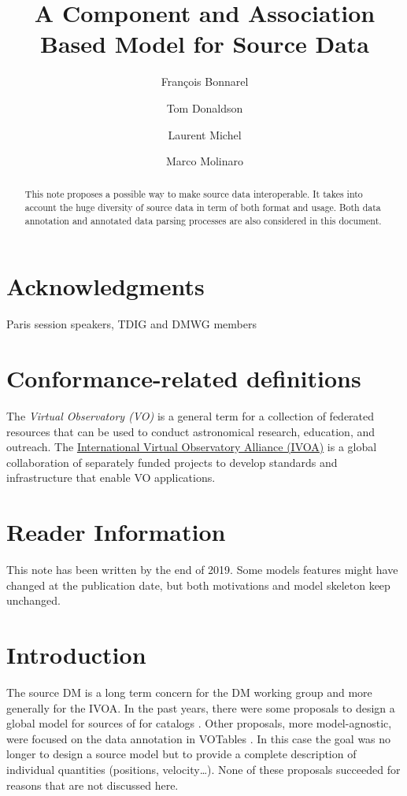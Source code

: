 \documentclass[11pt,a4paper]{ivoa}
\title{A Component and Association Based Model for Source Data}
\author[http://wiki.ivoa.net/twiki/bin/view/IVOA/FrancoisBonnarel]{François Bonnarel}
\author[http://wiki.ivoa.net/twiki/bin/view/IVOA/TomDonaldson]{Tom Donaldson}
\author[http://wiki.ivoa.net/twiki/bin/view/IVOA/LaurentMichel]{Laurent Michel}
\author[http://wiki.ivoa.net/twiki/bin/view/IVOA/MarcoMolinaro]{Marco Molinaro}
\begin{document}
\begin{abstract}
This note proposes a possible way to make source data interoperable. It takes into account the huge diversity of source data in term of both format and usage. Both data annotation and annotated data parsing processes are also considered in this document.
\end{abstract}


\section*{Acknowledgments}

Paris session speakers, TDIG and DMWG members

\section*{Conformance-related definitions}


The \emph{Virtual Observatory (VO)} is a
general term for a collection of federated resources that can be used
to conduct astronomical research, education, and outreach.
The \href{http://www.ivoa.net}{International
Virtual Observatory Alliance (IVOA)} is a global
collaboration of separately funded projects to develop standards and
infrastructure that enable VO applications.

\section*{Reader Information}
This note has been written by the end of 2019. Some models features might have changed at the publication date, but both motivations and model skeleton keep unchanged.

\section{Introduction}

The source DM is a long term concern for the DM working group and more generally for the IVOA.
In the past years, there were some proposals to design a global model for sources \citep{wd:jesusdm} of for catalogs \citep{wd:catalog}.
Other proposals, more model-agnostic, were focused on the data annotation in VOTables \citep{note:stcvot} \citep{note:seb}. In this case the goal was no longer to design a source model but to provide a complete description of  individual quantities (positions, velocity…).
None of these proposals succeeded for reasons that are not discussed here. 
\end{document}
